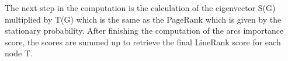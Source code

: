 The next step in the computation is the calculation of the eigenvector S(G) multiplied by T(G) which is the same as the PageRank which is given by the stationary probability. After finishing the computation of the arcs importance score, the scores are summed up to retrieve the final LineRank score for each node T.